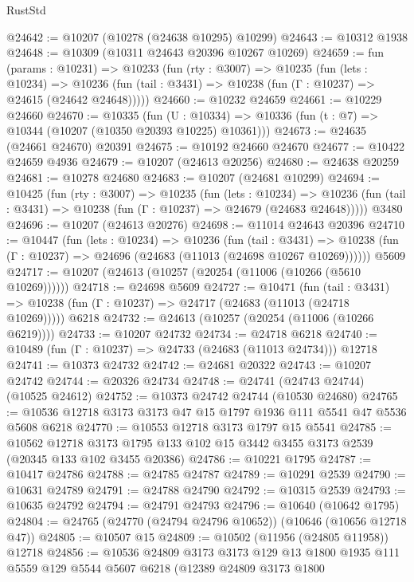 \begin{lexlean}{RustStd}
\begin{coremodule}
@24642 := @10207 (@10278 (@24638 @10295) @10299)
@24643 := @10312 @1938
@24648 := @10309 (@10311 @24643 @20396 @10267 @10269)
@24659 := fun (params : @10231) =>
  @10233
    (fun (rty : @3007) =>
    @10235
      (fun (lets : @10234) =>
      @10236 (fun (tail : @3431) => @10238 (fun (Γ : @10237) => @24615 (@24642 @24648)))))
@24660 := @10232 @24659
@24661 := @10229 @24660
@24670 := @10335
    (fun (U : @10334) => @10336 (fun (t : @7) => @10344 (@10207 (@10350 @20393 @10225) @10361)))
@24673 := @24635 (@24661 @24670) @20391
@24675 := @10192 @24660 @24670
@24677 := @10422 @24659 @4936
@24679 := @10207 (@24613 @20256)
@24680 := @24638 @20259
@24681 := @10278 @24680
@24683 := @10207 (@24681 @10299)
@24694 := @10425
    (fun (rty : @3007) =>
    @10235
      (fun (lets : @10234) =>
      @10236 (fun (tail : @3431) => @10238 (fun (Γ : @10237) => @24679 (@24683 @24648)))))
    @3480
@24696 := @10207 (@24613 @20276)
@24698 := @11014 @24643 @20396
@24710 := @10447
    (fun (lets : @10234) =>
    @10236
      (fun (tail : @3431) =>
      @10238 (fun (Γ : @10237) => @24696 (@24683 (@11013 (@24698 @10267 @10269))))))
    @5609
@24717 := @10207 (@24613 (@10257 (@20254 (@11006 (@10266 (@5610 @10269))))))
@24718 := @24698 @5609
@24727 := @10471
    (fun (tail : @3431) => @10238 (fun (Γ : @10237) => @24717 (@24683 (@11013 (@24718 @10269)))))
    @6218
@24732 := @24613 (@10257 (@20254 (@11006 (@10266 @6219))))
@24733 := @10207 @24732
@24734 := @24718 @6218
@24740 := @10489 (fun (Γ : @10237) => @24733 (@24683 (@11013 @24734))) @12718
@24741 := @10373 @24732
@24742 := @24681 @20322
@24743 := @10207 @24742
@24744 := @20326 @24734
@24748 := @24741 (@24743 @24744) (@10525 @24612)
@24752 := @10373 @24742 @24744 (@10530 @24680)
@24765 := @10536 @12718 @3173 @3173 @47 @15 @1797 @1936 @111 @5541 @47 @5536 @5608 @6218
@24770 := @10553 @12718 @3173 @1797 @15 @5541
@24785 := @10562
    @12718
    @3173
    @1795
    @133
    @102
    @15
    @3442
    @3455
    @3173
    @2539
    (@20345 @133 @102 @3455 @20386)
@24786 := @10221 @1795
@24787 := @10417 @24786
@24788 := @24785 @24787
@24789 := @10291 @2539
@24790 := @10631 @24789
@24791 := @24788 @24790
@24792 := @10315 @2539
@24793 := @10635 @24792
@24794 := @24791 @24793
@24796 := @10640 (@10642 @1795)
@24804 := @24765 (@24770 (@24794 @24796 @10652)) (@10646 (@10656 @12718 @47))
@24805 := @10507 @15
@24809 := @10502 (@11956 (@24805 @11958)) @12718
@24856 := @10536
    @24809
    @3173
    @3173
    @129
    @13
    @1800
    @1935
    @111
    @5559
    @129
    @5544
    @5607
    @6218
    (@12389
      @24809
      @3173
      @1800

\end{coremodule}
\end{lexlean}
